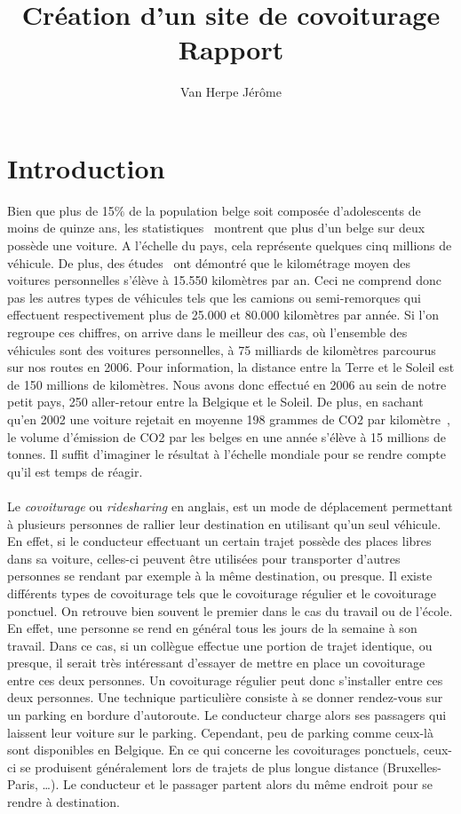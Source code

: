 \documentclass[12pt, a4paper, oneside]{article}
\title{Création d'un site de covoiturage\\ \bigskip{} Rapport}
\author{Van Herpe Jérôme}
\begin{document}
\maketitle
\newpage
\null
\newpage
\renewcommand{\leftmark}{TABLE DES MATI\`{E}RES}
\thispagestyle{fancy}
\tableofcontents
\newpage
\section{Introduction}
    Bien que plus de 15$\%$ de la population belge soit composée d'adolescents de moins de quinze ans, les statistiques~\cite{stats-mondiale} montrent que plus d'un belge sur deux possède une voiture. A l'échelle du pays, cela représente quelques cinq millions de véhicule. De plus, des études~\cite{stats-ecologie} ont démontré que le kilométrage moyen des voitures personnelles s'élève à 15.550 kilomètres par an. Ceci ne comprend donc pas les autres types de véhicules tels que les camions ou semi-remorques qui effectuent respectivement plus de 25.000 et 80.000 kilomètres par année. Si l'on regroupe ces chiffres, on arrive dans le meilleur des cas, où l'ensemble des véhicules sont des voitures personnelles, à 75 milliards de kilomètres parcourus sur nos routes en 2006. Pour information, la distance entre la Terre et le Soleil est de 150 millions de kilomètres. Nous avons donc effectué en 2006 au sein de notre petit pays, 250 aller-retour entre la Belgique et le Soleil. De plus, en sachant qu'en 2002 une voiture rejetait en moyenne 198 grammes de CO2 par kilomètre~\cite{stats-co2}, le volume d'émission de CO2 par les belges en une année s'élève à 15 millions de tonnes. Il suffit d'imaginer le résultat à l'échelle mondiale pour se rendre compte qu'il est temps de réagir.\\\\
    \indent Le \textit{covoiturage} ou \textit{ridesharing} en anglais, est un mode de déplacement permettant à plusieurs personnes de rallier leur destination en utilisant qu'un seul véhicule. En effet, si le conducteur effectuant un certain trajet possède des places libres dans sa voiture, celles-ci peuvent être utilisées pour transporter d'autres personnes se rendant par exemple à la même destination, ou presque. Il existe différents types de covoiturage tels que le covoiturage régulier et le covoiturage ponctuel. On retrouve bien souvent le premier dans le cas du travail ou de l'école. En effet, une personne se rend en général tous les jours de la semaine à son travail. Dans ce cas, si un collègue effectue une portion de trajet identique, ou presque, il serait très intéressant d'essayer de mettre en place un covoiturage entre ces deux personnes. Un covoiturage régulier peut donc s'installer entre ces deux personnes. Une technique particulière consiste à se donner rendez-vous sur un parking en bordure d'autoroute. Le conducteur charge alors ses passagers qui laissent leur voiture sur le parking. Cependant, peu de parking comme ceux-là sont disponibles en Belgique. En ce qui concerne les covoiturages ponctuels, ceux-ci se produisent généralement lors de trajets de plus longue distance (Bruxelles-Paris, \dots). Le conducteur et le passager partent alors du même endroit pour se rendre à destination.\\\\
\end{document}
